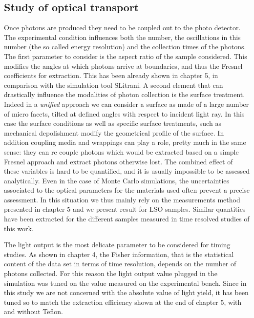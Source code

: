 \subsection{Study of optical transport}
Once photons are produced they need to be coupled out to the photo detector. The experimental condition influences both the number, the oscillations in this number (the so called energy resolution) and the collection times of the photons. 
The first parameter to consider is the aspect ratio of the sample considered. This modifies the angles at which photons arrive at boundaries, and thus the Fresnel coefficients for extraction. This has been already shown in chapter 5, in comparison with the simulation tool SLitrani.
A second element that can drastically influence the modalities of photon collection is the surface treatment. Indeed in a \textit{unified} approach we can consider a surface as made of a large number of micro facets, tilted at defined angles with respect to incident light ray. In this case the surface conditions as well as specific surface treatments, such as mechanical depolishment modify the geometrical profile of the surface.
In addition coupling media and wrappings can play a role, pretty much in the same sense: they can re couple photons which would be extracted based on a simple Fresnel approach and extract photons otherwise lost.
The combined effect of these variables is hard to be quantified, and it is usually impossible to be assessed analytically. Even in the case of Monte Carlo simulations, the uncertainties associated to the optical parameters for the materials used often prevent a precise assessment. In this situation we thus mainly rely on the measurements method presented in chapter 5 and we present result for LSO samples. Similar quantities have been extracted for the different samples measured in time resolved studies of this work.

The light output is the most delicate parameter to be considered for timing studies. As shown in chapter 4, the Fisher information, that is the statistical content of the data set in terms of time resolution, depends on the number of photons collected. For this reason the light output value plugged in the simulation was tuned on the value measured on the experimental bench. Since in this study we are not concerned with the absolute value of light yield, it has been tuned so to match the extraction efficiency shown at the end of chapter 5, with and without Teflon.

